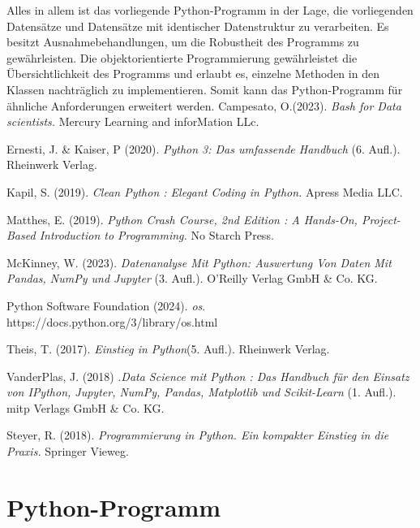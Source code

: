 \documentclass[
    a4paper, 								%
    oneside, 								%
    11pt, 									%
    listof=totoc, 					%
    bibliography=totoc, 		%
    final, 									%
    numbers=noenddot
]{scrreprt}
\newenvironment{literatur}{\parskip 6pt \parindent 0pt  \def\lititem{\hangindent=0.7cm \hangafter 1}}{\par\ignorespaces}
\begin{document}
Alles in allem ist das vorliegende Python-Programm in der Lage, die vorliegenden Datensätze und Datensätze mit identischer Datenstruktur zu verarbeiten. Es besitzt Ausnahmebehandlungen, um die Robustheit des Programms zu gewährleisten. Die objektorientierte Programmierung gewährleistet die Übersichtlichkeit des Programms und erlaubt es, einzelne Methoden in den Klassen nachträglich zu implementieren. Somit kann das Python-Programm für ähnliche Anforderungen erweitert werden. 
\newpage
{}
\begin{literatur}
\lititem Campesato, O.(2023). \textit{Bash for Data scientists.}  Mercury Learning and inforMation LLc.

\lititem Ernesti, J. \& Kaiser, P (2020). \textit{Python 3: Das umfassende Handbuch} (6. Aufl.). Rheinwerk Verlag.

\lititem Kapil, S. (2019). \textit{Clean Python : Elegant Coding in Python.} Apress Media LLC.

\lititem Matthes, E. (2019). \textit{Python Crash Course, 2nd Edition : A Hands-On, Project-Based Introduction to Programming.} No Starch Press.

\lititem McKinney, W. (2023). \textit{Datenanalyse Mit Python: Auswertung Von Daten Mit Pandas, NumPy und Jupyter} (3. Aufl.). O'Reilly Verlag GmbH \& Co. KG.

\lititem Python Software Foundation (2024). \textit{os}. https://docs.python.org/3/library/os.html

\lititem Theis, T. (2017). \textit{Einstieg in Python}(5. Aufl.). Rheinwerk Verlag.

\lititem VanderPlas, J. (2018) .\textit{Data Science mit Python : Das Handbuch für den Einsatz von IPython, Jupyter, NumPy, Pandas, Matplotlib und Scikit-Learn }(1. Aufl.). mitp Verlags GmbH \& Co. KG.









\lititem Steyer, R. (2018). \textit{Programmierung in Python. Ein kompakter Einstieg in die Praxis.} Springer Vieweg. 
\end{literatur}
\appendix
\setcounter{chapter}{1}
\section{Python-Programm}
\begin{minipage}{\textwidth}	
	
\end{minipage}

\end{document}
